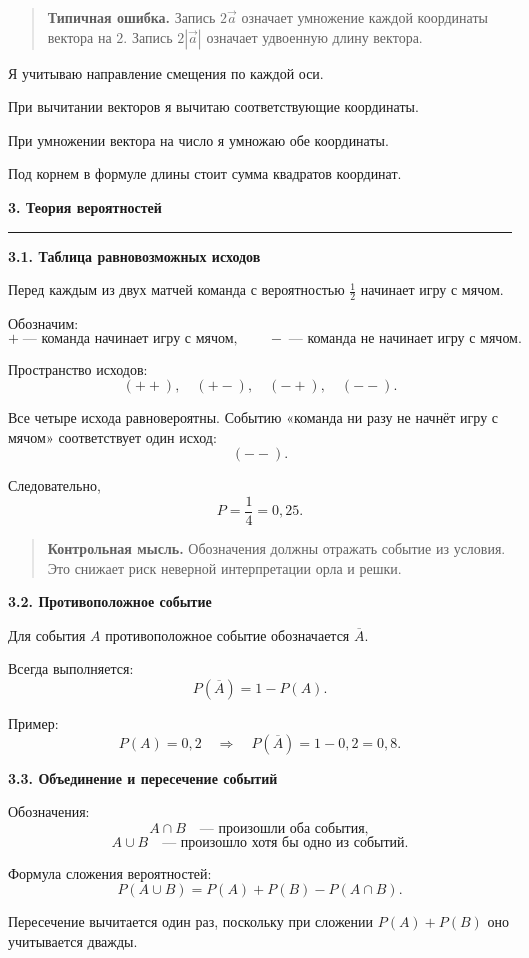 \documentclass[a4paper,12pt]{article}
\newcommand{\topic}[1]{%
  \par\bigskip
  {\Large\bfseries\color{darkaccent}#1\par}
  \vspace{0.2em}
  {\color{accent}\rule{\linewidth}{0.7pt}}
  \vspace{0.55em}
}
\newcommand{\subtopic}[1]{%
  \par\medskip
  {\large\bfseries\color{darkaccent}#1\par}
  \vspace{0.2em}
}
\newcommand{\control}[1]{%
  \begin{quote}
    \color{darkaccent}\textbf{Контрольная мысль.}\;
    \color{textgray}#1
  \end{quote}
}
\newcommand{\warning}[1]{%
  \begin{quote}
    \color{darkaccent}\textbf{Типичная ошибка.}\;
    \color{textgray}#1
  \end{quote}
}
\begin{document}
\warning{Запись \(2\vec a\) означает умножение каждой координаты вектора на \(2\). Запись \(2|\vec a|\) означает удвоенную длину вектора.}

\begin{checklist}
  \item Я учитываю направление смещения по каждой оси.
  \item При вычитании векторов я вычитаю соответствующие координаты.
  \item При умножении вектора на число я умножаю обе координаты.
  \item Под корнем в формуле длины стоит сумма квадратов координат.
\end{checklist}

\topic{3. Теория вероятностей}

\subtopic{3.1. Таблица равновозможных исходов}

Перед каждым из двух матчей команда с вероятностью
\(\frac12\) начинает игру с мячом.

Обозначим:
\[
+\; \text{--- команда начинает игру с мячом},
\qquad
-\; \text{--- команда не начинает игру с мячом}.
\]

Пространство исходов:
\[
(++),\quad (+-),\quad (-+),\quad (--).
\]

Все четыре исхода равновероятны. Событию «команда ни разу не начнёт
игру с мячом» соответствует один исход:
\[
(--).
\]

Следовательно,
\[
P=\frac14=0,25.
\]

\control{Обозначения должны отражать событие из условия. Это снижает риск неверной интерпретации орла и решки.}

\subtopic{3.2. Противоположное событие}

Для события \(A\) противоположное событие обозначается
\(\overline A\).

Всегда выполняется:
\[
P(\overline A)=1-P(A).
\]

Пример:
\[
P(A)=0,2
\quad\Longrightarrow\quad
P(\overline A)=1-0,2=0,8.
\]

\subtopic{3.3. Объединение и пересечение событий}

Обозначения:
\[
A\cap B
\quad\text{--- произошли оба события},
\]
\[
A\cup B
\quad\text{--- произошло хотя бы одно из событий}.
\]

Формула сложения вероятностей:
\[
P(A\cup B)
=
P(A)+P(B)-P(A\cap B).
\]

Пересечение вычитается один раз, поскольку при сложении
\(P(A)+P(B)\) оно учитывается дважды.
\end{document}
